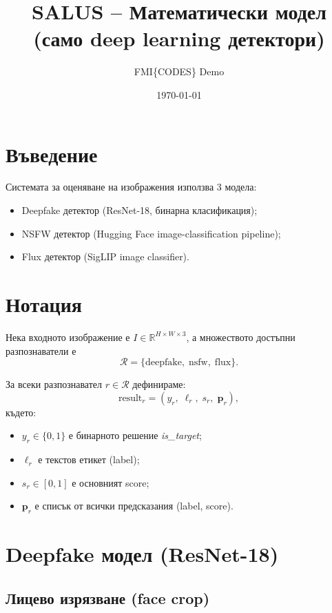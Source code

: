 \documentclass[12pt,a4paper]{article}
\title{\textbf{SALUS -- Математически модел (само deep learning детектори)}}
\author{FMI\{CODES\} Demo}
\date{\today}
\begin{document}
\maketitle
\tableofcontents
\newpage

\section{Въведение}

Системата за оценяване на изображения използва 3 модела:
\begin{itemize}
  \item Deepfake детектор (ResNet-18, бинарна класификация);
  \item NSFW детектор (Hugging Face image-classification pipeline);
  \item Flux детектор (SigLIP image classifier).
\end{itemize}

\section{Нотация}

Нека входното изображение е $I \in \mathbb{R}^{H \times W \times 3}$,
а множеството достъпни разпознаватели е
\begin{equation}
\mathcal{R} = \{\text{deepfake},\; \text{nsfw},\; \text{flux}\}.
\end{equation}

За всеки разпознавател $r \in \mathcal{R}$ дефинираме:
\begin{equation}
\text{result}_r = (y_r,\; \ell_r,\; s_r,\; \mathbf{p}_r),
\end{equation}
където:
\begin{itemize}
  \item $y_r \in \{0,1\}$ е бинарното решение \emph{is\_target};
  \item $\ell_r$ е текстов етикет (label);
  \item $s_r \in [0,1]$ е основният score;
  \item $\mathbf{p}_r$ е списък от всички предсказания (label, score).
\end{itemize}

\section{Deepfake модел (ResNet-18)}

\subsection{Лицево изрязване (face crop)}
\end{document}
